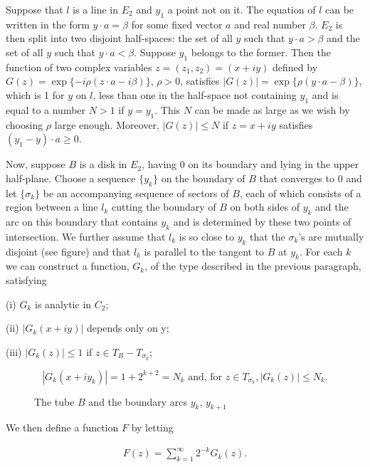 Suppose that $l$ is a line in $E_2$ and $y_1$ a point not on it. The equation of $l$ can be written in the form $y \cdot a = \beta$ for some fixed vector $a$ and real number $\beta$. $E_2$ is then split into two disjoint half-spaces: the set of all $y$ such that $y \cdot a > \beta$ and the set of all $y$ such that $y \cdot a < \beta$. Suppose $y_1$ belongs to the former. Then the function of two complex variables $z = (z_1, z_2) = (x + iy)$ defined by $G(z) = \exp \{-i\rho(z \cdot a - i\beta)\}$, $\rho > 0$, satisfies $|G(z)| = \exp \{\rho(y \cdot a - \beta)\}$, which is 1 for $y$ on $l$, less than one in the half-space not containing $y_1$ and is equal to a number $N > 1$ if $y = y_1$. This $N$ can be made as large as we wish by choosing $\rho$ large enough. Moreover, $|G(z)| \leq N$ if $z = x + iy$ satisfies $(y_1 - y) \cdot a \geq 0$.

Now, suppose $B$ is a disk in $E_2$, having 0 on its boundary and lying in the upper half-plane. Choose a sequence $\{y_k\}$ on the boundary of $B$ that converges to 0 and let $\{\sigma_k\}$ be an accompanying sequence of sectors of $B$, each of which consists of a region between a line $l_k$ cutting the boundary of $B$ on both sides of $y_k$ and the arc on this boundary that contains $y_k$ and is determined by these two points of intersection. We further assume that $l_k$ is so close to $y_k$ that the $\sigma_k$'s are mutually disjoint (see figure) and that $l_k$ is parallel to the tangent to $B$ at $y_k$. For each $k$ we can construct a function, $G_k$, of the type described in the previous paragraph, satisfying

(i) $G_{k}$ is analytic in $C_{2}$;

(ii) $|G_{k}(x + iy)|$ depends only on y;

(iii) $|G_k(z)| \leq 1$ if $z \in T_B - T_{\sigma_k}$;

\[
{\left|G_{k}(x+i y_{k})\right|}=1+2^{k+2}=N_{k}\text{ and, for }z\in T_{\sigma_{k}},\left|G_{k}(z)\right|\leq N_{k}.
\]

\begin{figure}[htbp]
\centering
\figtube
\caption{The tube $B$ and the boundary arcs $y_k$, $y_{k+1}$}
\label{fig:c3-p108}
\end{figure}

We then define a function $F$ by letting

\[
\begin{array}{c} F(z) = \displaystyle\sum_{k=1}^{\infty} 2^{-k}G_{k}(z).\end{array}
\]

